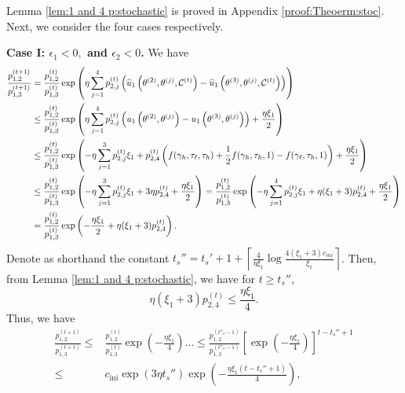 Lemma \ref{lem:1 and 4 p:stochastic} is proved in Appendix \ref{proof:Theoerm:stoc}. Next, we consider the four cases respectively. 

\noindent \textbf{Case I: $\epsilon_1<0,$ and $\epsilon_2<0$.} We have 
\begin{equation}
    \begin{split}
    \label{eqn:throrem 5:case1}
     \frac{p^{(t+1)}_{1,2}}{p^{(t+1)}_{1,3}}  = {} &  \frac{p^{(t)}_{1,2}}{p^{(t)}_{1,3}}\exp\left(\eta \sum_{j=1}^4 p^{(t)}_{2,j}\left(\widehat{u}_1\left(\theta^{(2)}, \theta^{(j)},\mathcal{C}^{(t)}\right)-\widehat{u}_1\left(\theta^{(3)}, \theta^{(j)},\mathcal{C}^{(t)}\right)\right)\right) \\ 
     \leq  {} &  \frac{p^{(t)}_{1,2}}{p^{(t)}_{1,3}}\exp\left(\eta \sum_{j=1}^4 p^{(t)}_{2,j}\left(u_1\left(\theta^{(2)}, \theta^{(j)}\right)-u_1\left(\theta^{(3)}, \theta^{(j)}\right)\right)+\frac{\eta\xi_1}{2}\right) \\
     \leq  {} &  \frac{p^{(t)}_{1,2}}{p^{(t)}_{1,3}}\exp\left( -\eta \sum_{j=1}^3p^{(t)}_{2,j}\xi_1 + p^{(t)}_{2,4}\left(f(\gamma_{h},\tau_{\ell},\tau_{h})+\frac{1}{2}f(\gamma_{h},\tau_{h},1)-f(\gamma_{\ell},\tau_h,1)\right)  +\frac{\eta\xi_1}{2}\right)\\
     \leq {} &  \frac{p^{(t)}_{1,2}}{p^{(t)}_{1,3}}\exp\left( -\eta \sum_{j=1}^3p^{(t)}_{2,j}\xi_1 + 3\eta p^{(t)}_{2,4} +\frac{\eta\xi_1}{2} \right)
     =  \frac{p^{(t)}_{1,2}}{p^{(t)}_{1,3}}\exp\left( -\eta \sum_{j=1}^4p^{(t)}_{2,j}\xi_1 + \eta(\xi_1+3) p^{(t)}_{2,4} +\frac{\eta\xi_1}{2} \right)\\
     = {} &  \frac{p^{(t)}_{1,2}}{p^{(t)}_{1,3}}\exp\left( -\frac{\eta\xi_1}{2} + \eta(\xi_1+3) p^{(t)}_{2,4}  \right).\\
    \end{split}
\end{equation}
Denote as shorthand the constant $t_s''=t_s'+1+\left\lceil\frac{4}{\eta\xi_1}\log\frac{4(\xi_1+3)c_{ini}}{\xi_1}\right\rceil$.
Then, from Lemma \ref{lem:1 and 4 p:stochastic}, we have for $t\geq t_s''$, 
$$\eta(\xi_1+3)p_{2,4}^{(t)}\leq \frac{\eta\xi_1}{4}.$$
Thus, we have  
\begin{equation*}
    \begin{split}
   \frac{p^{(t+1)}_{1,2}}{p^{(t+1)}_{1,3}} 
   \leq {} & \frac{p^{(t)}_{1,2}}{p^{(t)}_{1,3}} \exp\left(-\frac{\eta\xi_1}{4}\right) \ldots \leq \frac{p^{(t''_s-1)}_{1,2}}{p^{(t''_s-1)}_{1,3}} \left[\exp\left(-\frac{\eta\xi_1}{4}\right)\right]^{t-t_s''+1}\\
   \leq {} & c_{\text{ini}}\exp\left(3\eta t_s''\right)\exp\left(-\frac{\eta\xi_1(t-t_s''+1)}{4}\right),     
    \end{split}
\end{equation*}
